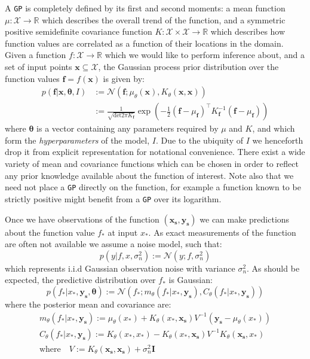 \documentclass{article}
\begin{document}
A \verb"GP" is completely defined by its first and second moments: a mean function $\mu : \mathcal{X} \rightarrow \mathbb{R}$ which describes the overall trend of the function, and a symmetric positive semidefinite covariance function $K : \mathcal{X} \times \mathcal{X} \rightarrow \mathbb{R}$ which describes how function values are correlated as a function of their locations in the domain. Given a function $f : \mathcal{X} \rightarrow \mathbb{R}$ which we would like to perform inference about, and a set of input points $\mathbf{x} \subseteq \mathcal{X}$, the Gaussian process prior distribution over the function values $\mathbf{f} = f(\mathbf{x})$ is given by:
\begin{align}
p(\mathbf{f} | \mathbf{x},\bm{\theta},I) &:= \mathcal{N}\left( \mathbf{f};\mu_\theta(\mathbf{x}),K_\theta(\mathbf{x},\mathbf{x}) \right) \\
&:= \frac{1}{\sqrt{\mathrm{det} 2 \pi K_{\mathbf{f}}} } \exp \left( - \frac{1}{2} (\mathbf{f}-\mu_{\mathbf{f}})^\top K_\mathbf{f}^{-1} (\mathbf{f}-\mu_{\mathbf{f}})  \right)
\end{align}
where $\bm{\theta}$ is a vector containing any parameters required by $\mu$ and $K$, and which form the \emph{hyperparameters} of the model, $I$. Due to the ubiquity of $I$ we henceforth drop it from explicit representation for notational convenience. %
There exist a wide variety of mean and covariance functions which can be chosen in order to reflect any prior knowledge available about the function of interest. Note also that we need not place a \verb"GP" directly on the function, for example a function known to be strictly positive might benefit from a \verb"GP" over its logarithm.

Once we have observations of the function $(\mathbf{x_s},\mathbf{y_s})$ we can make predictions about the function value $f_*$ at input $x_*$. As exact measurements of the function are often not available we assume a noise model, such that:
\begin{equation}\label{obsnoise}
p(y | f, x, \sigma_n^2) := \mathcal{N}(y; f, \sigma_n^2)
\end{equation} 
which represents i.i.d Gaussian observation noise with variance $\sigma_n^2$. As should be expected, the predictive distribution over $f_*$ is Gaussian:
\begin{equation}\label{posteriorpred}
p(f_* | x_*, \mathbf{y_s},\bm{\theta}) := \mathcal{N} ( f_* ; m_\theta(f_* | x_*, \mathbf{y_s}), C_\theta(f_* | x_*, \mathbf{y_s}))
\end{equation}
where the posterior mean and covariance are:
\begin{align}
m_\theta(f_* | x_*, \mathbf{y_s}) := \mu_\theta(x_*) + K_\theta(x_*,\mathbf{x_s})V^{-1}(\mathbf{y_s} - \mu_\theta(x_*))\\
C_\theta(f_* | x_*, \mathbf{y_s}) := K_\theta(x_*,x_*) - K_\theta(x_*,\mathbf{x_s})V^{-1}K_\theta(\mathbf{x_s},x_*)\\
\mathrm{where}\quad V := K_\theta(\mathbf{x_s},\mathbf{x_s}) + \sigma_n^2\mathbf{I}
\end{align}
\end{document}
